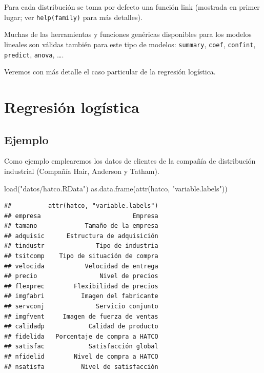 \documentclass[
]{book}
\newenvironment{Shaded}{\begin{snugshade}}{\end{snugshade}}
\newcommand{\FunctionTok}[1]{\textcolor[rgb]{0.00,0.00,0.00}{#1}}
\newcommand{\NormalTok}[1]{#1}
\newcommand{\StringTok}[1]{\textcolor[rgb]{0.31,0.60,0.02}{#1}}
\theoremstyle{break}
\theoremstyle{nonumberplain}
\begin{document}
Para cada distribución se toma por defecto una función link (mostrada en primer lugar; ver \texttt{help(family)} para más detalles).

Muchas de las herramientas y funciones genéricas disponibles para los modelos lineales son válidas
también para este tipo de modelos: \texttt{summary}, \texttt{coef}, \texttt{confint}, \texttt{predict}, \texttt{anova}, \ldots.

Veremos con más detalle el caso particular de la regresión logística.

\hypertarget{regresiuxf3n-loguxedstica}{%
\section{Regresión logística}\label{regresiuxf3n-loguxedstica}}

\hypertarget{ejemplo-2}{%
\subsection{Ejemplo}\label{ejemplo-2}}

Como ejemplo emplearemos los datos de clientes de la compañía de distribución industrial (Compañía Hair, Anderson y Tatham).

\begin{Shaded}
\begin{Highlighting}[]
\FunctionTok{load}\NormalTok{(}\StringTok{"datos/hatco.RData"}\NormalTok{)}
\FunctionTok{as.data.frame}\NormalTok{(}\FunctionTok{attr}\NormalTok{(hatco, }\StringTok{"variable.labels"}\NormalTok{))}
\end{Highlighting}
\end{Shaded}

\begin{verbatim}
##          attr(hatco, "variable.labels")
## empresa                         Empresa
## tamano             Tamaño de la empresa
## adquisic      Estructura de adquisición
## tindustr              Tipo de industria
## tsitcomp    Tipo de situación de compra
## velocida           Velocidad de entrega
## precio                 Nivel de precios
## flexprec        Flexibilidad de precios
## imgfabri          Imagen del fabricante
## servconj              Servicio conjunto
## imgfvent     Imagen de fuerza de ventas
## calidadp            Calidad de producto
## fidelida   Porcentaje de compra a HATCO
## satisfac            Satisfacción global
## nfidelid        Nivel de compra a HATCO
## nsatisfa          Nivel de satisfacción
\end{verbatim}
\end{document}
